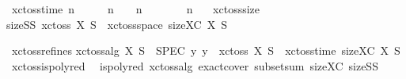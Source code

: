 {\isamarkupfalse%
\ {\isachardoublequoteopen}xc{\isacharunderscore}{\kern0pt}to{\isacharunderscore}{\kern0pt}ss{\isacharunderscore}{\kern0pt}time\ n\ {\isacharequal}{\kern0pt}\ {}\ {\isacharplus}{\kern0pt}\ {\isacharparenleft}{\kern0pt}{}\ {\isacharasterisk}{\kern0pt}\ n\ {\isacharplus}{\kern0pt}\ {}{\isacharparenright}{\kern0pt}\ {\isacharplus}{\kern0pt}\ {\isacharparenleft}{\kern0pt}n\ {\isacharplus}{\kern0pt}\ {}{\isacharparenright}{\kern0pt}\ {\isacharplus}{\kern0pt}\ {}\ {\isacharplus}{\kern0pt}\ {\isacharparenleft}{\kern0pt}{}\ {\isacharasterisk}{\kern0pt}\ n\ {\isacharplus}{\kern0pt}\ {}{\isacharparenright}{\kern0pt}{\isachardoublequoteclose}%
\isanewline 
{}\isamarkupfalse%
\ xc{\isacharunderscore}{\kern0pt}to{\isacharunderscore}{\kern0pt}ss{\isacharunderscore}{\kern0pt}size{\isacharcolon}{\kern0pt}\isanewline
{\isachardoublequoteopen}size{\isacharunderscore}{\kern0pt}SS\ {\isacharparenleft}{\kern0pt}xc{\isacharunderscore}{\kern0pt}to{\isacharunderscore}{\kern0pt}ss\ {\isacharparenleft}{\kern0pt}X{\isacharcomma}{\kern0pt}\ S{\isacharparenright}{\kern0pt}{\isacharparenright}{\kern0pt}\ {\isasymle}\ xc{\isacharunderscore}{\kern0pt}to{\isacharunderscore}{\kern0pt}ss{\isacharunderscore}{\kern0pt}space\ {\isacharparenleft}{\kern0pt}size{\isacharunderscore}{\kern0pt}XC\ {\isacharparenleft}{\kern0pt}X{\isacharcomma}{\kern0pt}\ S{\isacharparenright}{\kern0pt}{\isacharparenright}{\kern0pt}{\isachardoublequoteclose}\isanewline

\isanewline
{}\isamarkupfalse%
\ xc{\isacharunderscore}{\kern0pt}to{\isacharunderscore}{\kern0pt}ss{\isacharunderscore}{\kern0pt}refines{\isacharcolon}{\kern0pt}\isanewline
{\isachardoublequoteopen}xc{\isacharunderscore}{\kern0pt}to{\isacharunderscore}{\kern0pt}ss{\isacharunderscore}{\kern0pt}alg\ {\isacharparenleft}{\kern0pt}X{\isacharcomma}{\kern0pt}\ S{\isacharparenright}{\kern0pt}\ {\isasymle}\ SPEC\ {\isacharparenleft}{\kern0pt}{\isasymlambda}y{\isachardot}{\kern0pt}\ y\ {\isacharequal}{\kern0pt}\ xc{\isacharunderscore}{\kern0pt}to{\isacharunderscore}{\kern0pt}ss\ {\isacharparenleft}{\kern0pt}X{\isacharcomma}{\kern0pt}\ S{\isacharparenright}{\kern0pt}{\isacharparenright}{\kern0pt}\ {\isacharparenleft}{\kern0pt}{\isasymlambda}{\isacharunderscore}{\kern0pt}{\isachardot}{\kern0pt}\ xc{\isacharunderscore}{\kern0pt}to{\isacharunderscore}{\kern0pt}ss{\isacharunderscore}{\kern0pt}time\ {\isacharparenleft}{\kern0pt}size{\isacharunderscore}{\kern0pt}XC\ {\isacharparenleft}{\kern0pt}X{\isacharcomma}{\kern0pt}\ S{\isacharparenright}{\kern0pt}{\isacharparenright}{\kern0pt}{\isacharparenright}{\kern0pt}{\isachardoublequoteclose}\isanewline
\isanewline
{}\isamarkupfalse%
\ xc{\isacharunderscore}{\kern0pt}to{\isacharunderscore}{\kern0pt}ss{\isacharunderscore}{\kern0pt}ispolyred{\isacharcolon}{\kern0pt}\isanewline
\ \ {\isachardoublequoteopen}ispolyred\ xc{\isacharunderscore}{\kern0pt}to{\isacharunderscore}{\kern0pt}ss{\isacharunderscore}{\kern0pt}alg\ exact{\isacharunderscore}{\kern0pt}cover\ subset{\isacharunderscore}{\kern0pt}sum\ size{\isacharunderscore}{\kern0pt}XC\ size{\isacharunderscore}{\kern0pt}SS{\isachardoublequoteclose}
}

